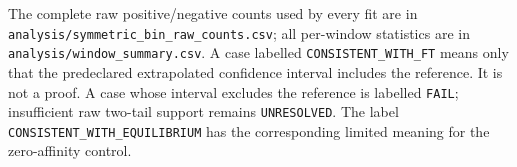 \documentclass[10pt]{article}
\begin{document}
The complete raw positive/negative counts used by every fit are in
\texttt{analysis/symmetric\_bin\_raw\_counts.csv}; all per-window statistics
are in \texttt{analysis/window\_summary.csv}.  A case labelled
\texttt{CONSISTENT\_WITH\_FT} means only that the predeclared extrapolated
confidence interval includes the reference.  It is not a proof.  A case whose
interval excludes the reference is labelled \texttt{FAIL}; insufficient raw
two-tail support remains \texttt{UNRESOLVED}.  The label
\texttt{CONSISTENT\_WITH\_EQUILIBRIUM} has the corresponding limited meaning
for the zero-affinity control.
\end{document}
